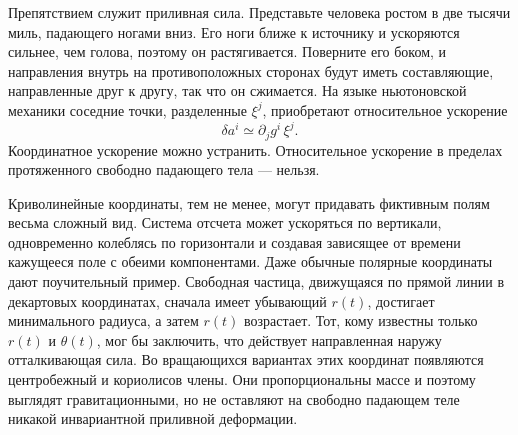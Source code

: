 Препятствием служит приливная сила. Представьте человека ростом в две тысячи миль, падающего ногами вниз. Его ноги ближе к источнику и ускоряются сильнее, чем голова, поэтому он растягивается. Поверните его боком, и направления внутрь на противоположных сторонах будут иметь составляющие, направленные друг к другу, так что он сжимается. На языке ньютоновской механики соседние точки, разделенные \(\xi^j\), приобретают относительное ускорение \begin{equation}
 \delta a^i \simeq \partial_j g^i\,\xi^j.
\label{eq:newtonian-tide}
\end{equation} Координатное ускорение можно устранить. Относительное ускорение в пределах протяженного свободно падающего тела — нельзя.

\begin{classroomqa}\end{classroomqa}

Криволинейные координаты, тем не менее, могут придавать фиктивным полям весьма сложный вид. Система отсчета может ускоряться по вертикали, одновременно колеблясь по горизонтали и создавая зависящее от времени кажущееся поле с обеими компонентами. Даже обычные полярные координаты дают поучительный пример. Свободная частица, движущаяся по прямой линии в декартовых координатах, сначала имеет убывающий \(r(t)\), достигает минимального радиуса, а затем \(r(t)\) возрастает. Тот, кому известны только \(r(t)\) и \(\theta(t)\), мог бы заключить, что действует направленная наружу отталкивающая сила. Во вращающихся вариантах этих координат появляются центробежный и кориолисов члены. Они пропорциональны массе и поэтому выглядят гравитационными, но не оставляют на свободно падающем теле никакой инвариантной приливной деформации.

\begin{classroomqa}
\end{classroomqa}

